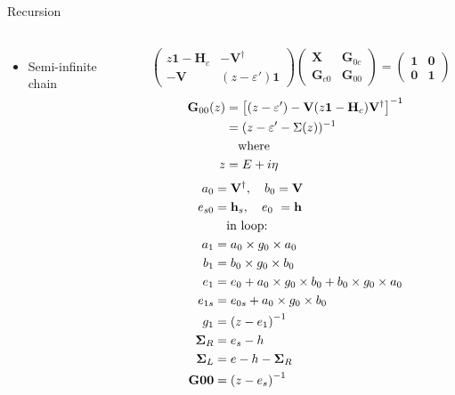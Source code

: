 \documentclass[hyperref={colorlinks=true,urlcolor=blue,linkcolor=.},aspectratio=1610,mathserif]{beamer}
\newcommand{\im}[3]{\inputminted[linenos=true, python3=true, firstline=#2, lastline=#3]{python}{#1}}
\begin{document}
\begin{frame}{Recursion}
\begin{overprint}
    \begin{center}
    \begin{columns}[c]
    \begin{itemize}
        \item Semi-infinite chain
    \end{itemize}
    \begin{align*}
	&\begin{pmatrix}
		z\mathbf{1}-\mathbf{H}_c & -\mathbf{V}^{\dagger} \\ -\mathbf{V} & (z-\varepsilon')\mathbf{1}
	\end{pmatrix}
	\begin{pmatrix}
		\mathbf{X}      & \mathbf{G}_{0c} \\
		\mathbf{G}_{c0} & \mathbf{G}_{00}
	\end{pmatrix}
	=
	\begin{pmatrix}
		\mathbf{1} & \mathbf{0} \\
		\mathbf{0} & \mathbf{1}
	\end{pmatrix}
	\end{align*}
	\begin{align*}
	 \mathbf{G}_{00}(z) &= \left[(z-\varepsilon')-\vb{V}(z\vb{1}-\vb{H}_c)\vb{V}^{\dagger}\right]^{-1} \\
	                   &= (z-\varepsilon'-\Sigma(z))^{-1}\\
	                   &\qq{where}\\
	                           z &= E+i\eta\\
    \end{align*}
    \begin{align*}
        a_0 &= \vb{V}^{\dagger}, \quad b_0 = \vb{V}\\
        e_{s0} &= \vb{h}_s, \quad e_0\ = \vb{h}\\
        &\qq{in loop:}\\
        a_1 &= a_0 \times g_0 \times a_0\\
        b_1 &= b_0 \times g_0 \times b_0\\
        e_1 &= e_0 + a_0 \times g_0 \times b_0 + b_0 \times g_0 \times a_0\\
        e_{1s} &= e_{0s} + a_0 \times g_0 \times b_0\\
        g_1 &= \pqty{z-e_1}^{-1}\\
        \vb{\Sigma}_R &= e_s - h\\
        \vb{\Sigma}_L &= e - h - \vb{\Sigma}_R\\
        \vb{G00} &= \pqty{z-e_s}^{-1}
    \end{align*}
    \end{columns}
    \end{center}
	    \im{Listings/Functions.py}{92}{109}
\end{overprint}
\end{frame}
\end{document}

